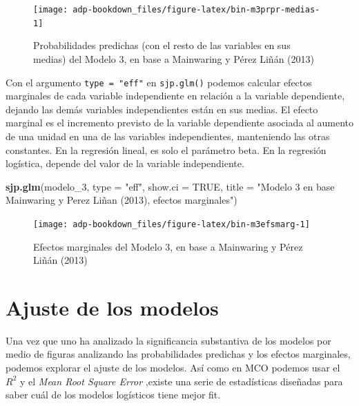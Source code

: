 \documentclass[]{book}
\newenvironment{Shaded}{\begin{snugshade}}{\end{snugshade}}
\newcommand{\KeywordTok}[1]{\textcolor[rgb]{0.13,0.29,0.53}{\textbf{#1}}}
\newcommand{\DataTypeTok}[1]{\textcolor[rgb]{0.13,0.29,0.53}{#1}}
\newcommand{\DecValTok}[1]{\textcolor[rgb]{0.00,0.00,0.81}{#1}}
\newcommand{\StringTok}[1]{\textcolor[rgb]{0.31,0.60,0.02}{#1}}
\newcommand{\OtherTok}[1]{\textcolor[rgb]{0.56,0.35,0.01}{#1}}
\newcommand{\NormalTok}[1]{#1}
\begin{document}
\begin{figure}

{\centering \texttt{[image: adp-bookdown\_files/figure-latex/bin-m3prpr-medias-1]} 

}

\caption{Probabilidades predichas (con el resto de las variables en sus medias) del Modelo 3, en base a Mainwaring y Pérez Liñán (2013)}\label{fig:bin-m3prpr-medias}
\end{figure}

Con el argumento \texttt{type\ =\ "eff"} en \texttt{sjp.glm()} podemos
calcular efectos marginales de cada variable independiente en relación a
la variable dependiente, dejando las demás variables independientes
están en sus medias. El efecto marginal es el incremento previsto de la
variable dependiente asociada al aumento de una unidad en una de las
variables independientes, manteniendo las otras constantes. En la
regresión lineal, es solo el parámetro beta. En la regresión logística,
depende del valor de la variable independiente.

\begin{Shaded}
\begin{Highlighting}[]
\KeywordTok{sjp.glm}\NormalTok{(modelo_}\DecValTok{3}\NormalTok{, }
        \DataTypeTok{type        =} \StringTok{"eff"}\NormalTok{,}
        \DataTypeTok{show.ci     =} \OtherTok{TRUE}\NormalTok{,}
        \DataTypeTok{title       =} \StringTok{"Modelo 3 en base Mainwaring y Perez Liñan (2013), efectos marginales"}\NormalTok{)}
\end{Highlighting}
\end{Shaded}

\begin{figure}

{\centering \texttt{[image: adp-bookdown\_files/figure-latex/bin-m3efsmarg-1]} 

}

\caption{Efectos marginales del Modelo 3, en base a Mainwaring y Pérez Liñán (2013)}\label{fig:bin-m3efsmarg}
\end{figure}

\section{Ajuste de los modelos}\label{ajuste-de-los-modelos}

Una vez que uno ha analizado la significancia substantiva de los modelos
por medio de figuras analizando las probabilidades predichas y los
efectos marginales, podemos explorar el ajuste de los modelos. Así como
en MCO podemos usar el \(R^2\) y el \emph{Mean Root Square Error}
,existe una serie de estadísticas diseñadas para saber cuál de los
modelos logísticos tiene mejor fit.
\end{document}
